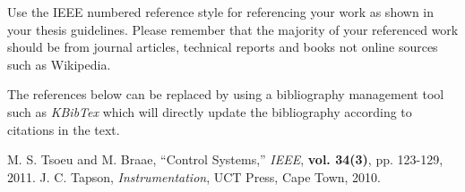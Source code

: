 Use the IEEE numbered reference style for referencing your work as shown in your thesis guidelines.
Please remember that the majority of your referenced work should be from journal articles, technical
reports and books not online sources such as Wikipedia.

The references below can be replaced by using a bibliography management tool such as \emph{KBibTex} which will directly update the bibliography according to citations in the text. 

\begin{thebibliography}{5}
 M. S. Tsoeu and M. Braae, ``Control Systems,'' \emph{IEEE}, {\bf vol. 34(3)}, pp. 123-129, 2011.
 J. C. Tapson, \emph{Instrumentation}, UCT Press, Cape Town, 2010.
\end{thebibliography}
